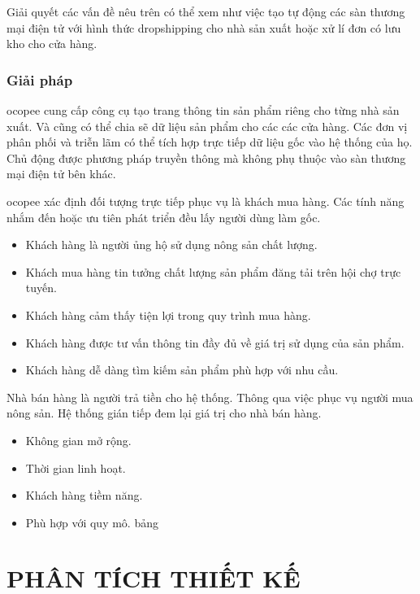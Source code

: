 \documentclass[11pt]{report}
\begin{document}
Giải quyết các vấn đề nêu trên có thể xem như việc tạo tự động các sàn thương mại điện tử với hình thức dropshipping cho nhà sản xuất hoặc xử lí đơn có lưu kho cho cửa hàng.

%

\subsection*{Giải pháp}

\gls{ocopee} cung cấp công cụ tạo trang thông tin sản phẩm riêng cho từng nhà sản xuất. Và cũng có thể chia sẽ dữ liệu sản phẩm cho các các cửa hàng. Các đơn vị phân phối và triễn lãm có thể tích hợp trực tiếp dữ liệu gốc vào hệ thống của họ. Chủ động được phương pháp truyền thông mà không phụ thuộc vào sàn thương mại điện tử bên khác.

\gls{ocopee} xác định đối tượng trực tiếp phục vụ là khách mua hàng. Các tính năng nhắm đến hoặc ưu tiên phát triển đều lấy người dùng làm gốc.

\begin{itemize}
\item Khách hàng là người ủng hộ sử dụng nông sản chất lượng.
\item Khách mua hàng tin tưởng chất lượng sản phẩm đăng tải trên hội chợ trực tuyến.
\item Khách hàng cảm thấy tiện lợi trong quy trình mua hàng.
\item Khách hàng được tư vấn thông tin đầy đủ về giá trị sử dụng của sản phẩm.
\item Khách hàng dễ dàng tìm kiếm sản phẩm phù hợp với nhu cầu.
\end{itemize}
Nhà bán hàng là người trả tiền cho hệ thống. Thông qua việc phục vụ người mua nông sản. Hệ thống gián tiếp đem lại giá
trị cho nhà bán hàng.
\begin{itemize}
\item Không gian mở rộng.
\item Thời gian linh hoạt.
\item Khách hàng tiềm năng.
\item Phù hợp với quy mô.
bảng
\end{itemize}



\chapter{PHÂN TÍCH THIẾT KẾ}
\end{document}
